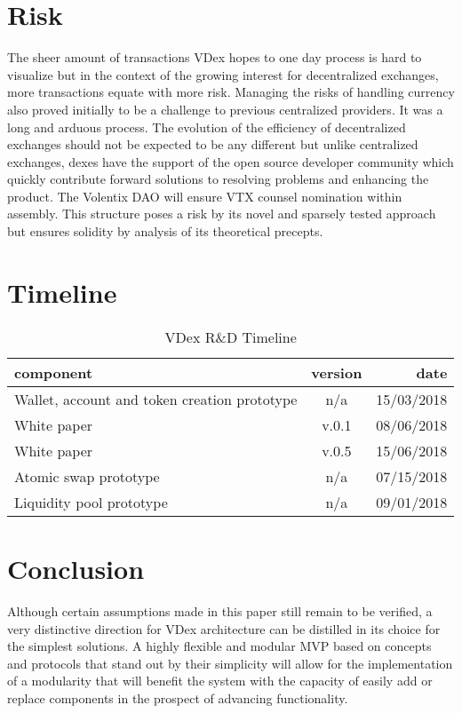 \documentclass[]{article}
\begin{document}
\section{Risk}
	The sheer amount of transactions VDex hopes to one day process is 
	hard to visualize but in the context of the growing interest for decentralized exchanges, more transactions equate with more risk. 
	Managing the risks of handling currency also proved initially to be a challenge to previous centralized providers.
	It was a long and arduous process.
	The evolution of the efficiency of decentralized exchanges should not be expected to be any different but unlike centralized exchanges, dexes have the support of the open source developer community which quickly contribute forward solutions to resolving problems and enhancing the product. The Volentix DAO will ensure VTX counsel nomination within assembly. This structure poses a risk by its novel and sparsely tested approach but ensures solidity by analysis of its theoretical precepts.   
	
\section{Timeline}	
\begin{table}[h!]
	\begin{center}
		\caption{VDex R\&D Timeline}
		\label{tab:table1}
		\begin{tabular}{l|c|r}
			\textbf{component} & \textbf{version}&  \textbf{date}  \\
			\hline
			Wallet, account and token creation prototype  & n/a & 15/03/2018\\
			\hline			
			White paper  & v.0.1 & 08/06/2018\\
			\hline
			White paper  & v.0.5 & 15/06/2018\\
			\hline
			Atomic swap prototype  & n/a & 07/15/2018\\
			\hline
			Liquidity pool prototype  & n/a & 09/01/2018\\
			\hline
			
		\end{tabular}
	\end{center}
\end{table}
		

\section{Conclusion}

Although certain assumptions made in this paper still remain to be verified,
a very distinctive direction for VDex architecture can be distilled in its choice for the simplest solutions. A highly flexible and modular MVP
based on concepts and protocols that stand out by their simplicity
will allow for the implementation of a modularity that will benefit 
the system with the capacity of easily add or replace components
in the prospect of advancing functionality.



\cite{1}
\cite{2}
\cite{3}
\cite{4}
\cite{5}
\cite{6}
\cite{7}
\cite{8}
\cite{9}
\cite{10}
\cite{11}
\cite{12}
\cite{13}
\cite{14}
\cite{15}
\cite{16}
\cite{17}
\cite{18}
\end{document}
